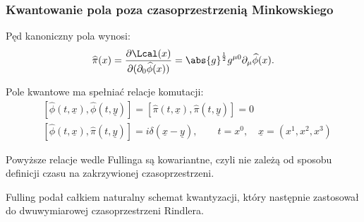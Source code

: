 \documentclass[10pt,t]{beamer}
\begin{document}
\begin{frame}
  \frametitle{Kwantowanie pola poza czasoprzestrzenią Minkowskiego}


  Pęd kanoniczny pola wynosi:
  \begin{equation}
    \label{eq:Promieniowanie-Hawkinga-06}
    \widehat{\pi}( x ) =
    \frac{ \partial \Lcal( x ) }{ \partial ( \partial_{ 0 } \widehat{ \phi }( x ) ) }
    = \abs{ g }^{ \frac{ 1 }{ 2 } } g^{ \mu 0 } \partial_{ \mu } \widehat{ \phi }( x ).
  \end{equation}

  Pole kwantowe ma spełniać relacje komutacji:
  \begin{subequations}
    \begin{align}
      \label{eq:Promieniowanie-Hawkinga-07-A}
      &[ \widehat{\phi}( t, \underline{x} ), \widehat{\phi}( t, \underline{y} ) ]
        =
        [ \widehat{\pi}( t, \underline{x} ), \widehat{\pi}( t, \underline{y} ) ]
        = 0 \\
      \label{eq:Promieniowanie-Hawkinga-07-B}
      &[ \widehat{\phi}( t, \underline{x} ), \widehat{\pi}( t, \underline{y} ) ]
        = i \delta( \underline{x} - \underline{y} ), \qquad
        t = x^{ 0 }, \quad \underline{x} = ( x^{ 1 }, x^{ 2 }, x^{ 3 } )
    \end{align}
  \end{subequations}

  Powyższe relacje wedle Fullinga są kowariantne, czyli nie zależą od
  sposobu definicji czasu na zakrzywionej czasoprzestrzeni.

  Fulling podał całkiem naturalny schemat kwantyzacji, który następnie
  zastosował do dwuwymiarowej czasoprzestrzeni Rindlera.

\end{frame}
\end{document}
